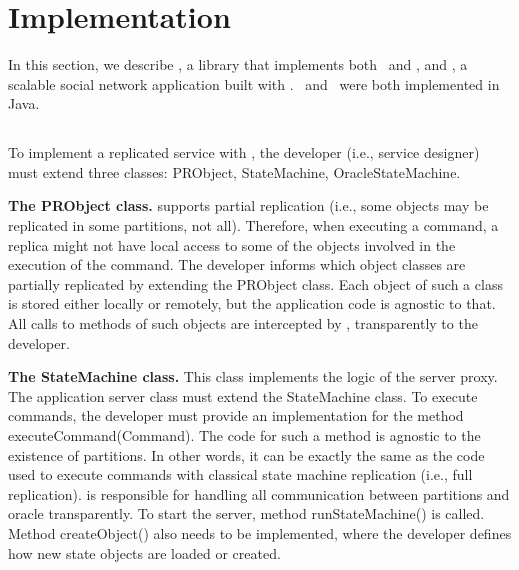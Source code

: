 \section{Implementation}
\label{sec:dssmr-implementation}

In this section, we describe \dssmrlibname{}, a library that implements both \ssmr\
and \dssmr{}, and \dssmrappname{}, a scalable social network application built with
\dssmrlibname{}. \dssmrlibname\ and \dssmrappname\ were both implemented in Java.

\subsection{\dssmrlibname}

To implement a replicated service with \dssmrlibname{}, the developer (i.e., service
designer) must extend three classes: PRObject, StateMachine, OracleStateMachine.

\textbf{The PRObject class.} \dssmrlibname{} supports partial replication (i.e., some
objects may be replicated in some partitions, not all). Therefore, when
executing a command, a replica might not have local access to some of the
objects involved in the execution of the command. The developer informs
\dssmrlibname{} which object classes are partially replicated by extending the
PRObject class. Each object of such a class is stored either locally or remotely,
but the application code is agnostic to that. All calls to methods of such
objects are intercepted by \dssmrlibname{}, transparently to the developer.


\textbf{The StateMachine class.} This class implements the logic of the server
proxy. The application server class must extend the StateMachine class. To
execute commands, the developer must provide an implementation for the method
executeCommand(Command). The code for such a method is agnostic to the existence
of partitions. In other words, it can be exactly the same as the code used to
execute commands with classical state machine replication (i.e., full
replication). \dssmrlibname{} is responsible for handling all communication between
partitions and oracle transparently. To start the server, method
runStateMachine() is called. Method createObject() also needs to be implemented,
where the developer defines how new state objects are loaded or created.


